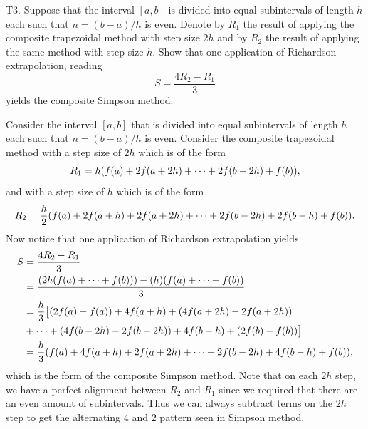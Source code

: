 \documentclass[12pt]{report}
\begin{document}
\begin{problem}
    T3. Suppose that the interval $[a, b]$ is divided into equal subintervals of length $h$ each such that $n = (b-a)/h$ is even. Denote by $R_1$ the result of applying the composite trapezoidal method with step size $2h$ and by $R_2$ the result of applying the same method with step size $h$. Show that one application of Richardson extrapolation, reading 
    \[ 
        S = \frac{4R_2 - R_1}{3}
    \]
    yields the composite Simpson method.

\end{problem}

\begin{solution}

    \noindent
    Consider the interval $[a,b]$ that is divided into equal subintervals of length $h$ each such that $n = (b-a)/h$ is even. Consider the composite trapezoidal method with a step size of $2h$ which is of the form
    \[ 
        R_1 = h{\left(f(a) + 2f(a + 2h) + \cdots + 2f(b - 2h) + f(b)\right)},
    \]
    and with a step size of $h$ which is of the form
    \[ 
        R_2 = \frac{h}{2}{\left(f(a) + 2f(a + h) + 2f(a + 2h) + \cdots + 2f(b - 2h) + 2f(b - h) + f(b)\right)}.
    \]
    Now notice that one application of Richardson extrapolation yields
    \begin{align*}
        S &= \frac{4R_2 - R_1}{3}\\
        &= \frac{{\left(2h(f(a) + \cdots + f(b))\right)} - {\left(h\right)}(f(a) + \cdots + f(b))}{3}\\
        &= \frac{h}{3}\big[ (2f(a) - f(a)) + 4f(a+h) + (4f(a + 2h) - 2f(a+2h))\\
        &+ \cdots + (4f(b - 2h) - 2f(b-2h)) + 4f(b-h) + (2f(b) - f(b))\big]\\
        &= \frac{h}{3} {\left( f(a) + 4f(a + h) + 2f(a +2h) + \cdots + 2f(b-2h) + 4f(b-h) + f(b)\right)},
    \end{align*}
    which is the form of the composite Simpson method. Note that on each $2h$ step, we have a perfect alignment between $R_2$ and $R_1$ since we required that there are an even amount of subintervals. Thus we can always subtract terms on the $2h$ step to get the alternating $4$ and $2$ pattern seen in Simpson method.  
\end{solution}

\newpage

\end{document}

